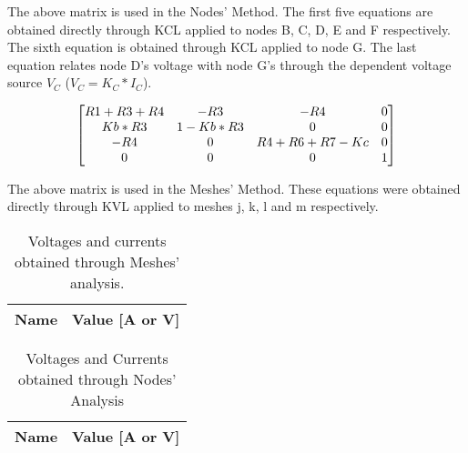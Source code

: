 The above matrix is used in the Nodes' Method. The first five equations are obtained directly through KCL applied to nodes B, C, D, E and F respectively. The sixth equation is obtained through KCL applied to node G. The last equation relates node D's voltage with node G's through the dependent voltage source $V_C$ ($V_C=K_C*I_C$).

\begin{equation}
\begin{bmatrix}
\centering
R1+R3+R4 & -R3 & -R4 & 0\\
Kb*R3 & 1-Kb*R3 & 0 & 0\\
-R4 & 0 & R4+R6+R7-Kc & 0\\
 0 & 0 & 0 & 1
\end{bmatrix}
\end{equation}
\par
\par
The above matrix is used in the Meshes' Method. These equations were obtained directly through KVL applied to meshes j, k, l and m respectively.


\begin{table}[h]
  \centering
  \begin{tabular}{|l|r|}
    \hline    
    {\bf Name} & {\bf Value [A or V]} \\ \hline
    
  \end{tabular}
  \caption{Voltages and currents obtained through Meshes' analysis.}
  \label{tab:MA}
\end{table}

\begin{table}[h]
  \centering
  \begin{tabular}{|l|r|}
    \hline
    {\bf Name} & {\bf Value [A or V]} \\ \hline
    
  \end{tabular}
  \caption{Voltages and Currents obtained through Nodes' Analysis}
  \label{tab:NA}
\end{table}


